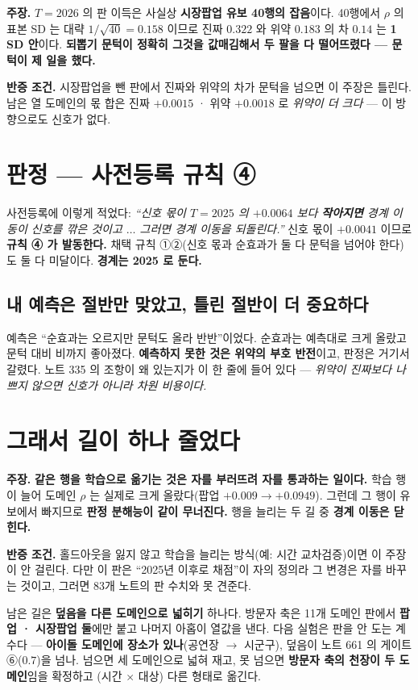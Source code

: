 \documentclass[10pt,a4paper]{article}
\newcommand{\claim}[2]{\begin{claimbox}\textbf{주장.} #1\par\smallskip
  \textcolor{gray!70}{\textbf{반증 조건.} #2}\end{claimbox}}
\begin{document}
\claim{$T{=}2026$ 의 판 이득은 사실상 \textbf{시장팝업 유보 40행의 잡음}이다.
40행에서 $\rho$ 의 표본 SD 는 대략 $1/\sqrt{40} = 0.158$ 이므로 진짜 $0.322$ 와
위약 $0.183$ 의 차 $0.14$ 는 \textbf{1 SD 안}이다. \textbf{되뽑기 문턱이 정확히
그것을 값매김해서 두 팔을 다 떨어뜨렸다 --- 문턱이 제 일을 했다.}}
{시장팝업을 뺀 판에서 진짜와 위약의 차가 문턱을 넘으면 이 주장은 틀린다.
남은 열 도메인의 몫 합은 진짜 $+0.0015$ · 위약 $+0.0018$ 로 \emph{위약이 더 크다} ---
이 방향으로도 신호가 없다.}

\section{판정 --- 사전등록 규칙 ④}

사전등록에 이렇게 적었다: \emph{``신호 몫이 $T{=}2025$ 의 $+0.0064$ 보다
\textbf{작아지면} 경계 이동이 신호를 깎은 것이고 $\ldots$ 그러면 경계 이동을
되돌린다.''} 신호 몫이 $+0.0041$ 이므로 \textbf{규칙 ④ 가 발동한다.} 채택 규칙
①②(신호 몫과 순효과가 둘 다 문턱을 넘어야 한다)도 둘 다 미달이다. \textbf{경계는
2025 로 둔다.}

\subsection*{내 예측은 절반만 맞았고, 틀린 절반이 더 중요하다}

예측은 ``순효과는 오르지만 문턱도 올라 반반''이었다. 순효과는 예측대로 크게 올랐고
문턱 대비 비까지 좋아졌다. \textbf{예측하지 못한 것은 위약의 부호 반전}이고, 판정은
거기서 갈렸다. 노트 335 의 조항이 왜 있는지가 이 한 줄에 들어 있다 ---
\emph{위약이 진짜보다 나쁘지 않으면 신호가 아니라 차원 비용이다.}

\section{그래서 길이 하나 줄었다}

\claim{\textbf{같은 행을 학습으로 옮기는 것은 자를 부러뜨려 자를 통과하는 일이다.}
학습 행이 늘어 도메인 $\rho$ 는 실제로 크게 올랐다(팝업 $+0.009 \to +0.0949$).
그런데 그 행이 유보에서 빠지므로 \textbf{판정 분해능이 같이 무너진다.} 행을 늘리는
두 길 중 \textbf{경계 이동은 닫힌다.}}
{홀드아웃을 잃지 않고 학습을 늘리는 방식(예: 시간 교차검증)이면 이 주장이 안 걸린다.
다만 이 판은 ``2025년 이후로 채점''이 자의 정의라 그 변경은 자를 바꾸는 것이고,
그러면 83개 노트의 판 수치와 못 견준다.}

남은 길은 \textbf{덮음을 다른 도메인으로 넓히기} 하나다. 방문자 축은 11개 도메인 판에서
\textbf{팝업 · 시장팝업 둘}에만 붙고 나머지 아홉이 열값을 낸다. 다음 실험은 판을 안
도는 계수다 --- \textbf{아이돌 도메인에 장소가 있나}(공연장 $\to$ 시군구), 덮음이
노트 661 의 게이트 ⑥($0.7$)을 넘나. 넘으면 세 도메인으로 넓혀 재고, 못 넘으면
\textbf{방문자 축의 천장이 두 도메인}임을 확정하고 (시간 $\times$ 대상) 다른 형태로 옮긴다.
\end{document}
